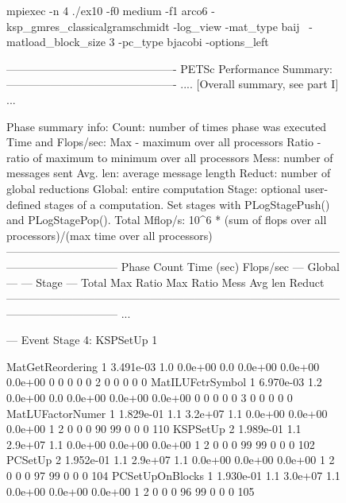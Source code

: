 \begin{figure}[tb]
  \begin{outputlisting}[\tiny\ttfamily]
mpiexec -n 4 ./ex10 -f0 medium -f1 arco6 -ksp_gmres_classicalgramschmidt -log_view -mat_type baij \
            -matload_block_size 3 -pc_type bjacobi -options_left

---------------------------------------------- PETSc Performance Summary: ----------------------------------------------
.... [Overall summary, see part I] ...

Phase summary info:
   Count: number of times phase was executed
   Time and Flops/sec: Max - maximum over all processors
                       Ratio - ratio of maximum to minimum over all processors
   Mess: number of messages sent
   Avg. len: average message length
   Reduct: number of global reductions
   Global: entire computation
   Stage: optional user-defined stages of a computation. Set stages with PLogStagePush() and PLogStagePop().
   Total Mflop/s: 10^6 * (sum of flops over all processors)/(max time over all processors)
------------------------------------------------------------------------------------------------------------------------
Phase              Count      Time (sec)       Flops/sec                          --- Global ---  --- Stage ---   Total
                            Max    Ratio      Max    Ratio  Mess  Avg len  Reduct %
------------------------------------------------------------------------------------------------------------------------
...

--- Event Stage 4: KSPSetUp 1

MatGetReordering       1  3.491e-03   1.0  0.0e+00   0.0  0.0e+00 0.0e+00 0.0e+00  0  0  0  0  0   2  0  0  0  0     0
MatILUFctrSymbol       1  6.970e-03   1.2  0.0e+00   0.0  0.0e+00 0.0e+00 0.0e+00  0  0  0  0  0   3  0  0  0  0     0
MatLUFactorNumer       1  1.829e-01   1.1  3.2e+07   1.1  0.0e+00 0.0e+00 0.0e+00  1  2  0  0  0  90 99  0  0  0   110
KSPSetUp               2  1.989e-01   1.1  2.9e+07   1.1  0.0e+00 0.0e+00 0.0e+00  1  2  0  0  0  99 99  0  0  0   102
PCSetUp                2  1.952e-01   1.1  2.9e+07   1.1  0.0e+00 0.0e+00 0.0e+00  1  2  0  0  0  97 99  0  0  0   104
PCSetUpOnBlocks        1  1.930e-01   1.1  3.0e+07   1.1  0.0e+00 0.0e+00 0.0e+00  1  2  0  0  0  96 99  0  0  0   105


\end{outputlisting}
\end{figure}
